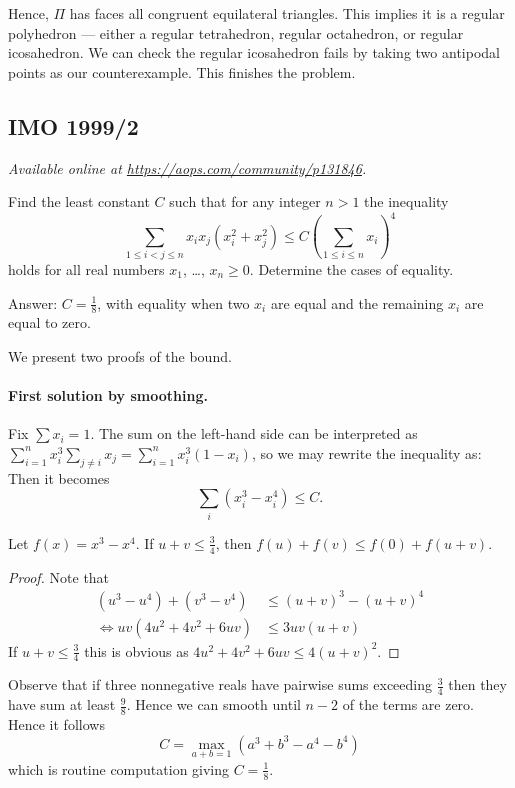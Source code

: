 \documentclass[11pt]{scrartcl}
\begin{document}
Hence, $\Pi$ has faces all congruent equilateral triangles.
This implies it is a regular polyhedron --- either
a regular tetrahedron, regular octahedron,
or regular icosahedron.
We can check the regular icosahedron fails by
taking two antipodal points as our counterexample.
This finishes the problem.
\pagebreak

\subsection{IMO 1999/2}
\textsl{Available online at \url{https://aops.com/community/p131846}.}
\begin{mdframed}[style=mdpurplebox,frametitle={Problem statement}]
Find the least constant $C$ such that
for any integer $n > 1$ the inequality
\[\sum_{1 \le i < j \le n} x_i x_j (x_i^2 + x_j^2)
  \le C \left( \sum_{1 \le i \le n} x_i \right)^4\]
holds for all real numbers $x_1$, \dots, $x_n \ge 0$.
Determine the cases of equality.
\end{mdframed}
Answer: $C = \frac 18$, with equality when two $x_i$ are equal
and the remaining $x_i$ are equal to zero.

We present two proofs of the bound.

\paragraph{First solution by smoothing.}
Fix $\sum x_i = 1$.
The sum on the left-hand side can be interpreted as
$\sum_{i=1}^n x_i^3 \sum_{j \neq i} x_j = \sum_{i=1}^n x_i^3(1-x_i)$,
so we may rewrite the inequality as:
Then it becomes \[ \sum_i (x_i^3 - x_i^4) \le C. \]

\begin{claim*}
  [Smoothing]
  Let $f(x) = x^3 - x^4$.
  If $u + v \le \frac 34$, then $f(u) + f(v) \le f(0) + f(u+v)$.
\end{claim*}
\begin{proof}
  Note that
  \begin{align*}
    (u^3-u^4)+(v^3-v^4) &\le (u+v)^3-(u+v)^4 \\
    \iff uv(4u^2+4v^2+6uv) &\le 3uv(u+v)
  \end{align*}
  If $u+v\le \frac 34$ this is obvious as
  $4u^2+4v^2+6uv \le 4(u+v)^2$.
\end{proof}

Observe that if three nonnegative reals have pairwise sums
exceeding $\frac34$ then they have sum at least $\frac 98$.
Hence we can smooth until $n-2$ of the terms are zero.
Hence it follows
\[ C = \max_{a+b=1} (a^3+b^3-a^4-b^4) \]
which is routine computation giving $C = \frac18$.
\end{document}
